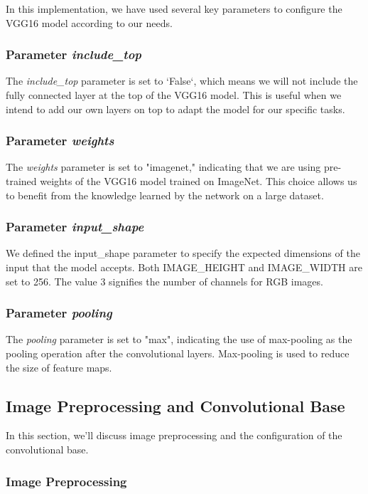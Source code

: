 In this implementation, we have used several key parameters to configure the VGG16 model according to our needs.

\subsubsection{Parameter \textit{include\_top}}
The \textit{include\_top} parameter is set to `False`, which means we will not include the fully connected layer at the 
top of the VGG16 model. This is useful when we intend to add our own layers on top to adapt the model for our specific tasks.

\subsubsection{Parameter \textit{weights}}
The \textit{weights} parameter is set to "imagenet," indicating that we are using pre-trained weights of the VGG16
model trained on ImageNet. This choice allows us to benefit from the knowledge learned by the network on a large dataset.

\subsubsection{Parameter \textit{input\_shape}}
We defined the input\_shape parameter to specify the expected dimensions of the input that the model accepts. 
Both IMAGE\_HEIGHT and IMAGE\_WIDTH are set to 256. The value 3 signifies the number of channels for RGB images.

\subsubsection{Parameter \textit{pooling}}
The \textit{pooling} parameter is set to "max", indicating the use of max-pooling as the pooling operation after the 
convolutional layers. Max-pooling is used to reduce the size of feature maps.


\subsection{Image Preprocessing and Convolutional Base}

In this section, we'll discuss image preprocessing and the configuration of the convolutional base.

\subsubsection{Image Preprocessing}

